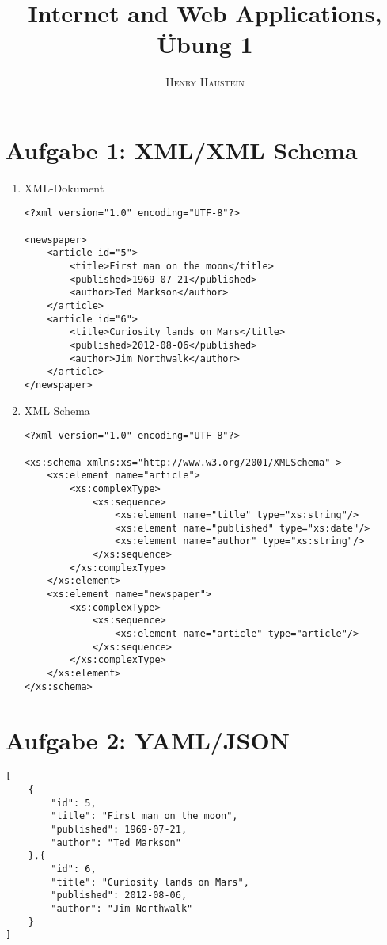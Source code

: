 \documentclass{article}
\title{\textbf{Internet and Web Applications, Übung 1}}
\author{\textsc{Henry Haustein}}
\date{}
\begin{document}
	\maketitle
	
	\section*{Aufgabe 1: XML/XML Schema}
	\begin{enumerate}[label=(\alph*)]
		\item XML-Dokument
		\begin{lstlisting}[style=xml]
<?xml version="1.0" encoding="UTF-8"?>

<newspaper>
	<article id="5">
		<title>First man on the moon</title>
		<published>1969-07-21</published>
		<author>Ted Markson</author>
	</article>
	<article id="6">
		<title>Curiosity lands on Mars</title>
		<published>2012-08-06</published>
		<author>Jim Northwalk</author>
	</article>
</newspaper>
		\end{lstlisting}
		\item XML Schema
		\begin{lstlisting}[style=xml]
<?xml version="1.0" encoding="UTF-8"?>

<xs:schema xmlns:xs="http://www.w3.org/2001/XMLSchema" >
	<xs:element name="article">
		<xs:complexType>
			<xs:sequence>
				<xs:element name="title" type="xs:string"/>
				<xs:element name="published" type="xs:date"/>
				<xs:element name="author" type="xs:string"/>
			</xs:sequence>
		</xs:complexType>
	</xs:element>
	<xs:element name="newspaper">
		<xs:complexType>
			<xs:sequence>
				<xs:element name="article" type="article"/>
			</xs:sequence>
		</xs:complexType>
	</xs:element>
</xs:schema>
		\end{lstlisting}
	\end{enumerate}

	\section*{Aufgabe 2: YAML/JSON}
	\begin{lstlisting}[style=json]
[
	{
		"id": 5,
		"title": "First man on the moon",
		"published": 1969-07-21,
		"author": "Ted Markson"
	},{
		"id": 6,
		"title": "Curiosity lands on Mars",
		"published": 2012-08-06,
		"author": "Jim Northwalk"
	}
]
	\end{lstlisting}
	
\end{document}
